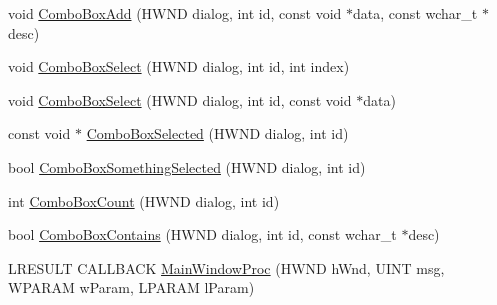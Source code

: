 \begin{DoxyCompactItemize}
\item 
void \hyperlink{namespacemage_a78e4a1d3c21d6eb8657bfa0a9631d6ee}{Combo\+Box\+Add} (H\+W\+ND dialog, int id, const void $\ast$data, const wchar\+\_\+t $\ast$desc)
\item 
void \hyperlink{namespacemage_aa510d1e5e45102338fce66ae46b2b267}{Combo\+Box\+Select} (H\+W\+ND dialog, int id, int index)
\item 
void \hyperlink{namespacemage_a026dd5ecb1cea93f38193f403e878d23}{Combo\+Box\+Select} (H\+W\+ND dialog, int id, const void $\ast$data)
\item 
const void $\ast$ \hyperlink{namespacemage_affa0d91f266dfbe4ed4a29c26b04dcb8}{Combo\+Box\+Selected} (H\+W\+ND dialog, int id)
\item 
bool \hyperlink{namespacemage_afa2451527062c4213d21bdf01b1922c6}{Combo\+Box\+Something\+Selected} (H\+W\+ND dialog, int id)
\item 
int \hyperlink{namespacemage_a5c586938d7f59a82c8528fab41f17960}{Combo\+Box\+Count} (H\+W\+ND dialog, int id)
\item 
bool \hyperlink{namespacemage_a98228034fca63017765bcdf5966be239}{Combo\+Box\+Contains} (H\+W\+ND dialog, int id, const wchar\+\_\+t $\ast$desc)
\item 
L\+R\+E\+S\+U\+LT C\+A\+L\+L\+B\+A\+CK \hyperlink{namespacemage_a7ab7652c75189226bf8299647e897c99}{Main\+Window\+Proc} (H\+W\+ND h\+Wnd, U\+I\+NT msg, W\+P\+A\+R\+AM w\+Param, L\+P\+A\+R\+AM l\+Param)
\end{DoxyCompactItemize}
